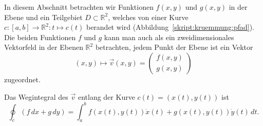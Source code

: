 In diesem Abschnitt betrachten wir Funktionen $f(x,y)$ und $g(x,y)$
in der Ebene und ein Teilgebiet $D\subset \mathbb R^2$, welches
von einer Kurve $c\colon [a,b]\to\mathbb R^2\colon t\mapsto c(t)$
berandet wird (Abbildung~\ref{skript:kruemmung:pfad}).
Die beiden Funktionen $f$ und $g$ kann man auch als ein zweidimensionales
Vektorfeld in der Ebenen $\mathbb R^2$ betrachten, jedem Punkt der
Ebene ist ein Vektor 
\[
(x,y)\mapsto \vec{v}(x,y)=\begin{pmatrix}f(x,y)\\g(x,y)\end{pmatrix}
\]
zugeordnet.

\begin{definition}
Das Wegintegral des $\vec v$ entlang der Kurve $c(t)=(x(t),y(t))$ ist
\[
\oint_c (f\,dx + g\,dy)
= 
\int_a^b f(x(t),y(t)) \dot x(t) + g(x(t),y(t)) \dot y(t)\,dt.
\]
\end{definition}


